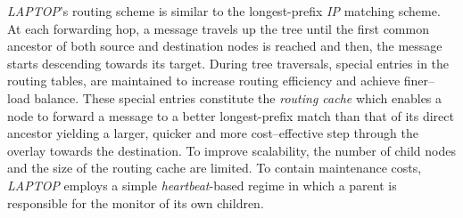 \emph{LAPTOP}'s routing scheme is similar to the 
longest-prefix \emph{IP} matching scheme. 
At each forwarding hop, a message travels up the tree 
until the first common ancestor of both source and destination nodes 
is reached and then, the message starts descending towards its target. 
During tree traversals, special entries in the routing tables,
are maintained to increase routing efficiency and achieve finer--load balance.
These special entries constitute the \emph{routing cache} which enables a node
to forward a message to a better 
longest-prefix match than that of its direct ancestor yielding
a larger, quicker and more cost--effective step through the overlay towards
the destination. 
To improve scalability, the number of child nodes and the
size of the routing cache are limited. 
To contain maintenance costs, \emph{LAPTOP} employs 
a simple \emph{heartbeat}-based regime in which 
a parent is responsible for the monitor of its own children.
%
%
%
